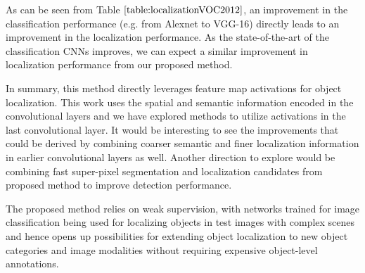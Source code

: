 \documentclass[runningheads]{llncs}
\begin{document}
 As can be seen from Table $\ref{table:localizationVOC2012}$, an improvement in the classification performance (e.g. from Alexnet to VGG-16) directly leads to an improvement in the localization performance. As the state-of-the-art of the classification CNNs improves, we can expect a similar improvement in localization performance from our proposed method.

In summary, this method directly leverages feature map activations for object localization. This work uses the spatial and semantic information encoded in the convolutional layers and we have explored methods to utilize activations in  the last convolutional layer. It would be interesting to see the improvements that could be derived by combining coarser semantic and finer localization information in earlier convolutional layers as well. Another direction to explore would be combining fast super-pixel segmentation and localization candidates from proposed method to improve detection performance.

The proposed method relies on weak supervision, with networks trained for image classification being used for localizing objects in test images with complex scenes and hence opens up possibilities for extending object localization to new object categories and image modalities without requiring expensive object-level annotations.



\clearpage
\end{document}
